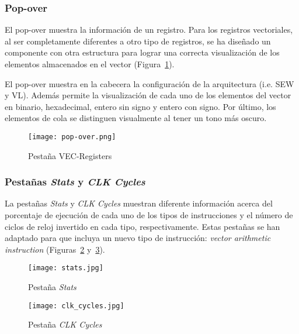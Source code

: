\subsubsection{Pop-over}

El pop-over muestra la información de un registro. Para los registros vectoriales, al ser completamente diferentes a otro tipo de registros, se ha diseñado un componente con otra estructura para lograr una correcta visualización de los elementos almacenados en el vector (Figura~\ref{fig:pop-over}).

El pop-over muestra en la cabecera la configuración de la arquitectura (i.e. SEW y VL). Además permite la visualización de cada uno de los elementos del vector en binario, hexadecimal, entero sin signo y entero con signo. Por último, los elementos de cola se distinguen visualmente al tener un tono más oscuro.

\begin{figure}[H]

    \texttt{[image: pop-over.png]}
    \caption{Pestaña VEC-Registers}\label{fig:pop-over}
\end{figure}

\subsubsection{Pestañas \textit{Stats} y \textit{CLK Cycles}}

La pestañas \textit{Stats} y \textit{CLK Cycles} muestran diferente información acerca del porcentaje de ejecución de cada uno de los tipos de instrucciones y el número de ciclos de reloj invertido en cada tipo, respectivamente. Estas pestañas se han adaptado para que incluya un nuevo tipo de instrucción: \textit{vector arithmetic instruction} (Figuras~\ref{fig:stats-clk} y~\ref{fig:clk}).

    \begin{minipage}[t]{0.45\textwidth}
        \begin{figure}[H]
            {\texttt{[image: stats.jpg]}}
            \caption{Pestaña \textit{Stats}}\label{fig:stats-clk}
        \end{figure}
    \end{minipage}
    \hfill
    \begin{minipage}[t]{0.45\textwidth}
        \begin{figure}[H]
            {\texttt{[image: clk\_cycles.jpg]}}
            \caption{Pestaña \textit{CLK Cycles}}\label{fig:clk}
        \end{figure}
    \end{minipage}

